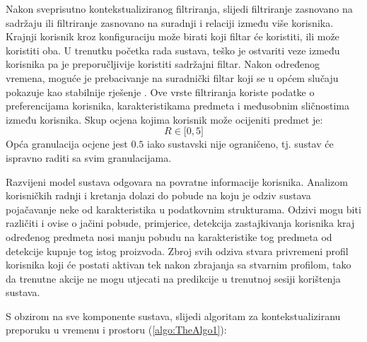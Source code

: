 \documentclass[times, utf8, diplomski, numeric]{fer}
\begin{document}
Nakon sveprisutno kontekstualiziranog filtriranja, slijedi filtriranje zasnovano
na sadržaju ili filtriranje zasnovano na suradnji i relaciji između više
korisnika. Krajnji korisnik kroz konfiguraciju može birati koji filtar će
koristiti, ili može koristiti oba. U trenutku početka rada sustava, teško je
ostvariti veze između korisnika pa je preporučljivije koristiti sadržajni
filtar. Nakon određenog vremena, moguće je prebacivanje na suradnički filtar
koji se u općem slučaju pokazuje kao stabilnije rješenje \cite{RSHandbook}.
Ove vrste filtriranja koriste podatke o preferencijama korisnika,
karakteristikama predmeta i međusobnim sličnostima između korisnika. Skup ocjena
kojima korisnik može ocijeniti predmet je:
\begin{equation}
	\label{eq:ratings}
	R \in \big[0,5\big]
\end{equation}
Opća granulacija ocjene jest $0.5$ iako sustavski nije ograničeno, tj. sustav
će ispravno raditi sa svim granulacijama.

Razvijeni model sustava odgovara na povratne informacije korisnika. Analizom
korisničkih radnji i kretanja dolazi do pobude na koju je odziv sustava
pojačavanje neke od karakteristika u podatkovnim strukturama. Odzivi mogu biti
različiti i ovise o jačini pobude, primjerice, detekcija zastajkivanja korisnika
kraj određenog predmeta nosi manju pobudu na karakteristike tog predmeta od
detekcije kupnje tog istog proizvoda. Zbroj svih odziva stvara privremeni profil
korisnika koji će postati aktivan tek nakon zbrajanja sa stvarnim profilom, tako
da trenutne akcije ne mogu utjecati na predikcije u trenutnoj sesiji korištenja
sustava.

S obzirom na sve komponente sustava, slijedi algoritam za kontekstualiziranu
preporuku u vremenu i prostoru (\ref{algo:TheAlgo1}):
\end{document}

